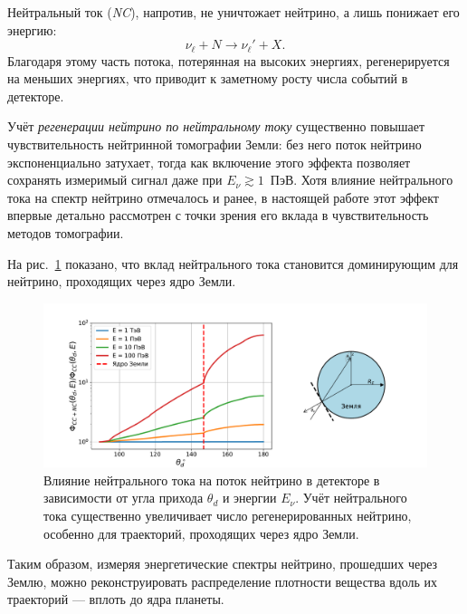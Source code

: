 Нейтральный ток (\textit{NC}), напротив, не уничтожает нейтрино, а лишь понижает его энергию:
\[
\nu_\ell + N \to \nu_\ell' + X.
\]
Благодаря этому часть потока, потерянная на высоких энергиях, регенерируется на меньших энергиях, что приводит к заметному росту числа событий в детекторе.

Учёт \emph{регенерации нейтрино по нейтральному току} существенно повышает чувствительность нейтринной томографии Земли: без него поток нейтрино экспоненциально затухает, тогда как включение этого эффекта позволяет сохранять измеримый сигнал даже при $E_\nu \gtrsim 1$~ПэВ. 
Хотя влияние нейтрального тока на спектр нейтрино отмечалось и ранее, в настоящей работе этот эффект впервые детально рассмотрен с точки зрения его вклада в чувствительность методов томографии.

На рис.~\ref{EF1} показано, что вклад нейтрального тока становится доминирующим для нейтрино, проходящих через ядро Земли.

\begin{figure}[!h]
\centering
\includegraphics[width=\linewidth]{images/NuProp/rhh12zf_flux_index_CT18ZNNLO.pdf}
\caption{Влияние нейтрального тока на поток нейтрино в детекторе в зависимости от угла прихода $\theta_d$ и энергии $E_\nu$.  
Учёт нейтрального тока существенно увеличивает число регенерированных нейтрино, особенно для траекторий, проходящих через ядро Земли.}
\label{EF1}
\end{figure}

Таким образом, измеряя энергетические спектры нейтрино, прошедших через Землю, можно реконструировать распределение плотности вещества вдоль их траекторий — вплоть до ядра планеты.



